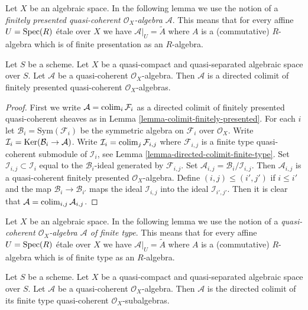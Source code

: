 \noindent
Let $X$ be an algebraic space. In the following lemma we use the notion
of a {\it finitely presented quasi-coherent $\mathcal{O}_X$-algebra
$\mathcal{A}$}. This means that for every affine
$U = \mathop{\mathrm{Spec}}(R)$ \'etale over $X$ we have $\mathcal{A}|_U = \widetilde{A}$
where $A$ is a (commutative) $R$-algebra which is of finite presentation
as an $R$-algebra.

\begin{lemma}
\label{lemma-algebra-directed-colimit-finite-presentation}
Let $S$ be a scheme. Let $X$ be a quasi-compact and quasi-separated
algebraic space over $S$.
Let $\mathcal{A}$ be a quasi-coherent $\mathcal{O}_X$-algebra.
Then $\mathcal{A}$ is a directed colimit of finitely presented
quasi-coherent $\mathcal{O}_X$-algebras.
\end{lemma}

\begin{proof}
First we write $\mathcal{A} = \mathop{\mathrm{colim}}\nolimits_i \mathcal{F}_i$ as a directed
colimit of finitely presented quasi-coherent sheaves as in
Lemma \ref{lemma-colimit-finitely-presented}.
For each $i$ let $\mathcal{B}_i = \text{Sym}(\mathcal{F}_i)$ be the
symmetric algebra on $\mathcal{F}_i$ over $\mathcal{O}_X$. Write
$\mathcal{I}_i = \mathop{\mathrm{Ker}}(\mathcal{B}_i \to \mathcal{A})$. Write
$\mathcal{I}_i = \mathop{\mathrm{colim}}\nolimits_j \mathcal{F}_{i, j}$ where
$\mathcal{F}_{i, j}$ is a finite type quasi-coherent submodule of
$\mathcal{I}_i$, see
Lemma \ref{lemma-directed-colimit-finite-type}.
Set $\mathcal{I}_{i, j} \subset \mathcal{I}_i$
equal to the $\mathcal{B}_i$-ideal generated by $\mathcal{F}_{i, j}$.
Set $\mathcal{A}_{i, j} = \mathcal{B}_i/\mathcal{I}_{i, j}$.
Then $\mathcal{A}_{i, j}$ is a quasi-coherent finitely presented
$\mathcal{O}_X$-algebra. Define $(i, j) \leq (i', j')$ if
$i \leq i'$ and the map $\mathcal{B}_i \to \mathcal{B}_{i'}$
maps the ideal $\mathcal{I}_{i, j}$ into the ideal $\mathcal{I}_{i', j'}$.
Then it is clear that $\mathcal{A} = \mathop{\mathrm{colim}}\nolimits_{i, j} \mathcal{A}_{i, j}$.
\end{proof}

\noindent
Let $X$ be an algebraic space. In the following lemma we use the notion
of a {\it quasi-coherent $\mathcal{O}_X$-algebra $\mathcal{A}$
of finite type}. This means that for every affine
$U = \mathop{\mathrm{Spec}}(R)$ \'etale over $X$ we have $\mathcal{A}|_U = \widetilde{A}$
where $A$ is a (commutative) $R$-algebra which is of finite type
as an $R$-algebra.

\begin{lemma}
\label{lemma-algebra-directed-colimit-finite-type}
Let $S$ be a scheme. Let $X$ be a quasi-compact and quasi-separated algebraic
space over $S$. Let $\mathcal{A}$ be a quasi-coherent $\mathcal{O}_X$-algebra.
Then $\mathcal{A}$ is the directed colimit of its finite type
quasi-coherent $\mathcal{O}_X$-subalgebras.
\end{lemma}


